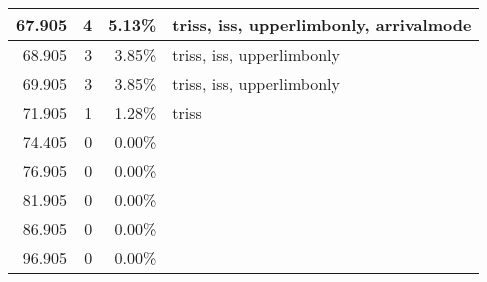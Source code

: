 \begin{table}[htbp]
{\begin{tabular}{|r|r|r|p{9.5cm}|}
67.905 & 4 & 5.13\% & triss, iss, upperlimbonly, arrivalmode \\ \hline
68.905 & 3 & 3.85\% & triss, iss, upperlimbonly \\ \hline
69.905 & 3 & 3.85\% & triss, iss, upperlimbonly \\ \hline
71.905 & 1 & 1.28\% & triss \\ \hline
74.405 & 0 & 0.00\% &  \\ \hline
76.905 & 0 & 0.00\% &  \\ \hline
81.905 & 0 & 0.00\% &  \\ \hline
86.905 & 0 & 0.00\% &  \\ \hline
96.905 & 0 & 0.00\% &  \\ \hline
\end{tabular}}
\end{table}
